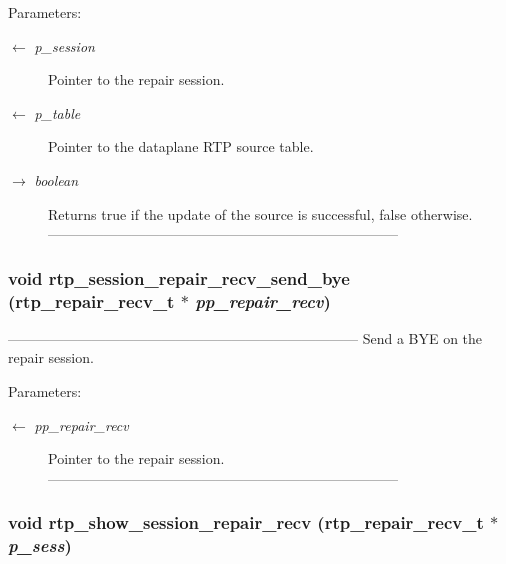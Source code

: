\begin{Desc}
\item[Parameters:]
\begin{description}
\item[\mbox{$\leftarrow$} {\em p\_\-session}]Pointer to the repair session. \item[\mbox{$\leftarrow$} {\em p\_\-table}]Pointer to the dataplane RTP source table. \item[\mbox{$\rightarrow$} {\em boolean}]Returns true if the update of the source is successful, false otherwise. --------------------------------------------------------------------------- \end{description}
\end{Desc}
\subsubsection{\setlength{\rightskip}{0pt plus 5cm}void rtp\_\-session\_\-repair\_\-recv\_\-send\_\-bye (\bf{rtp\_\-repair\_\-recv\_\-t} $\ast$ {\em pp\_\-repair\_\-recv})}\label{rtp__repair__recv_8c_a24b309f4dc43c934a1d0d73fb38cccf}


--------------------------------------------------------------------------- Send a BYE on the repair session.

\begin{Desc}
\item[Parameters:]
\begin{description}
\item[\mbox{$\leftarrow$} {\em pp\_\-repair\_\-recv}]Pointer to the repair session. --------------------------------------------------------------------------- \end{description}
\end{Desc}
\subsubsection{\setlength{\rightskip}{0pt plus 5cm}void rtp\_\-show\_\-session\_\-repair\_\-recv (\bf{rtp\_\-repair\_\-recv\_\-t} $\ast$ {\em p\_\-sess})}\label{rtp__repair__recv_8c_f5512608ba29d4342b401ef07646e38d}


